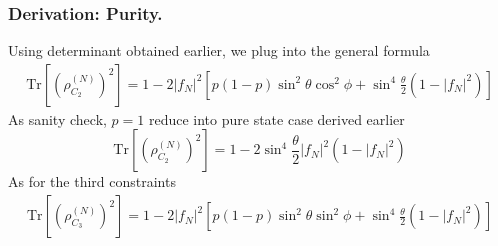 \documentclass[../../../main.tex]{subfiles}
\begin{document}
\subsubsection{Derivation: Purity.}
Using determinant obtained earlier, we plug into the general formula
\begin{align*}
  \mathrm{Tr}\left[\left(\rho^{(N)}_{C_2}\right)^2\right]
  =
  1
  -2|f_N|^2
  \left[
    p(1-p)\sin^2\theta\cos^2\phi
    +
    \sin^4\frac{\theta}{2}
    \left(1-|f_N|^2\right)
    \right]
\end{align*}
As sanity check, $p=1$ reduce into pure state case derived earlier
\begin{equation*}
  \mathrm{Tr}\left[\left(\rho^{(N)}_{C_2}\right)^2\right] =
  1
  -2\sin^4\frac{\theta}{2}
  |f_N|^2(1-|f_N|^2)
\end{equation*}
As for the third constraints
\begin{align*}
  \mathrm{Tr}\left[\left(\rho^{(N)}_{C_3}\right)^2\right]
  =
  1
  -2|f_N|^2
  \left[
    p(1-p)\sin^2\theta\sin^2\phi
    +
    \sin^4\frac{\theta}{2}
    \left(1-|f_N|^2\right)
    \right]
\end{align*}
\end{document}
